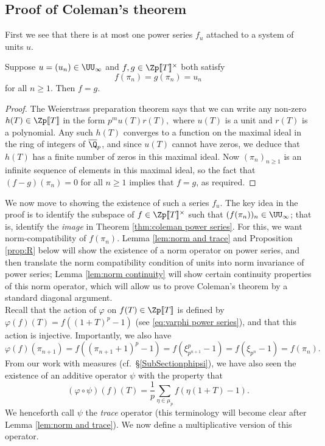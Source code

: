 \documentclass[a4paper,10pt, english, reqno]{smfart}
\newcommand{\lsem}{[\! [}
\newcommand{\rsem}{]\! ]}
\numberwithin{equation}{section}
\begin{document}
\subsection{Proof of Coleman's theorem}
\label{sec:proof of Coleman}
 First we see that there is at most one power series $f_u$ attached to a system of units $u$.

\begin{lemma}\label{lem:unique coleman}
Suppose $u = (u_n) \in \UU_\infty$ and $f, g \in \Zp\lsem T\rsem^\times$ both satisfy 
\[f(\pi_n) = g(\pi_n) = u_n\]
for all $n\geq 1$. Then $f = g$.
\end{lemma}
\begin{proof}
The Weierstrass preparation theorem says that we can write any non-zero $h(T) \in \Zp\lsem T\rsem $ in the form $p^m u(T)r(T),$ where $u(T)$ is a unit and $r(T)$ is a polynomial. Any such $h(T)$ converges to a function on the maximal ideal in the ring of integers of $\overline{\Q}_p$, and since $u(T)$ cannot have zeros, we deduce that $h(T)$ has a finite number of zeros in this maximal ideal. Now $(\pi_n)_{n\geq 1}$ is an infinite sequence of elements in this maximal ideal, so the fact that $(f-g)(\pi_n) = 0$ for all $n\geq 1$ implies that $f = g$, as required.
\end{proof}

We now move to showing the existence of such a series $f_u$. The key idea in the proof is to identify the subspace of $f \in \Zp\lsem T\rsem^\times$ such that $(f(\pi_n))_n \in \UU_\infty$; that is, identify the \emph{image} in Theorem \ref{thm:coleman power series}. For this, we want norm-compatibility of $f(\pi_n)$. Lemma \ref{lem:norm and trace} and Proposition \ref{prop:R} below will show the existence of a norm operator on power series, and then translate the norm compatibility condition of units into norm invariance of power series; Lemma \ref{lem:norm continuity} will show certain continuity properties of this norm operator, which will allow us to prove Coleman's theorem by a standard diagonal argument. \\

Recall that the action of $\varphi$ on $f(T) \in \Zp\lsem T\rsem $ is defined by $\varphi(f)(T) = f((1+T)^p - 1)$  (see \eqref{eq:varphi power series}), and that this action is injective. Importantly,  we also have
\begin{equation}\label{eq:varphi pin}
\varphi(f)(\pi_{n+1}) = f((\pi_{n+1} + 1)^p - 1) = f(\xi_{p^{n+1}}^p - 1)  = f(\xi_{p^n} - 1) = f(\pi_n).
\end{equation}
From our work with measures (cf.\ \S\ref{SubSectionphipsi}), we have also seen the existence of an additive operator $\psi$ with the property that
\[(\varphi\circ\psi)(f)(T) = \frac{1}{p}\sum_{\eta \in \mu_p} f(\eta (1+T)-1). \] 
We henceforth call $\psi$ the \emph{trace} operator (this terminology will become clear after Lemma \ref{lem:norm and trace}). We now define a multiplicative version of this operator.
\end{document}
